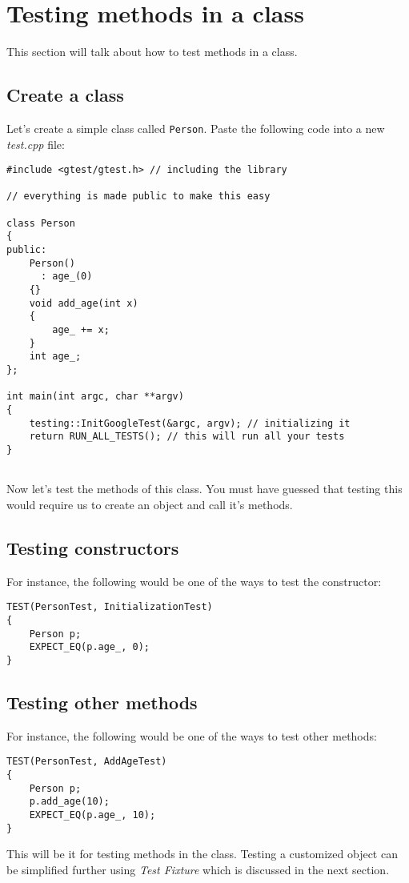 \section{Testing methods in a class}

This section will talk about how to test methods in a class. \\
\subsection{Create a class}
Let's create a simple class called \verb!Person!.
Paste the following code into a new \emph{test.cpp} file:
\begin{Verbatim}[frame=single]
#include <gtest/gtest.h> // including the library

// everything is made public to make this easy

class Person
{
public:
    Person()
      : age_(0)
    {}
    void add_age(int x)
    {
        age_ += x;
    }
    int age_;
};

int main(int argc, char **argv)
{
    testing::InitGoogleTest(&argc, argv); // initializing it
    return RUN_ALL_TESTS(); // this will run all your tests
}
  
\end{Verbatim}

Now let's test the methods of this class. You must have guessed that testing
this would require us to create an object and call it's methods.

\newpage

\subsection{Testing constructors}
For instance, the following would be one of the ways to test the constructor:

\begin{Verbatim}[frame=single]
TEST(PersonTest, InitializationTest)
{
    Person p;
    EXPECT_EQ(p.age_, 0);
}
\end{Verbatim}

\subsection{Testing other methods}
For instance, the following would be one of the ways to test other methods:
\begin{Verbatim}[frame=single]
TEST(PersonTest, AddAgeTest)
{
    Person p;
    p.add_age(10);
    EXPECT_EQ(p.age_, 10);
}
\end{Verbatim}

This will be it for testing methods in the class. Testing a customized object
can be simplified further using \emph{Test Fixture} which is discussed in the
next section.

\newpage
